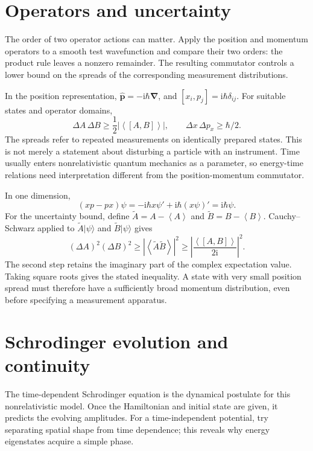 \documentclass[11pt,oneside]{book}
\newcommand{\ii}{\mathrm{i}}
\newcommand{\vect}[1]{\boldsymbol{#1}}
\newcommand{\grad}{\boldsymbol{\nabla}}
\newcommand{\avg}[1]{\left\langle #1\right\rangle}
\newcommand{\ket}[1]{\lvert #1\rangle}
\theoremstyle{reviewstyle}
\begin{document}
\section{Operators and uncertainty}
The order of two operator actions can matter. Apply the position and momentum operators to a smooth test wavefunction and compare their two orders: the product rule leaves a nonzero remainder. The resulting commutator controls a lower bound on the spreads of the corresponding measurement distributions.

In the position representation, $\hat{\vect p}=-\ii\hbar\grad$, and $[x_i,p_j]=\ii\hbar\delta_{ij}$. For suitable states and operator domains,
\begin{equation}\Delta A\,\Delta B\geq\frac12|\avg{[A,B]}|,\qquad \Delta x\,\Delta p_x\geq\hbar/2.\end{equation}
The spreads refer to repeated measurements on identically prepared states. This is not merely a statement about disturbing a particle with an instrument. Time usually enters nonrelativistic quantum mechanics as a parameter, so energy-time relations need interpretation different from the position-momentum commutator.

In one dimension,
\begin{equation}
(xp-px)\psi=-\ii\hbar x\psi'+\ii\hbar(x\psi)'
=\ii\hbar\psi.
\end{equation}
For the uncertainty bound, define $\widetilde A=A-\avg A$ and $\widetilde B=B-\avg B$. Cauchy--Schwarz applied to $\widetilde A\ket\psi$ and $\widetilde B\ket\psi$ gives
\begin{equation}
(\Delta A)^2(\Delta B)^2\geq
|\avg{\widetilde A\widetilde B}|^2
\geq\left|\frac{\avg{[A,B]}}{2\ii}\right|^2.
\end{equation}
The second step retains the imaginary part of the complex expectation value. Taking square roots gives the stated inequality. A state with very small position spread must therefore have a sufficiently broad momentum distribution, even before specifying a measurement apparatus.

\section{Schrodinger evolution and continuity}
The time-dependent Schrodinger equation is the dynamical postulate for this nonrelativistic model. Once the Hamiltonian and initial state are given, it predicts the evolving amplitudes. For a time-independent potential, try separating spatial shape from time dependence; this reveals why energy eigenstates acquire a simple phase.
\end{document}
